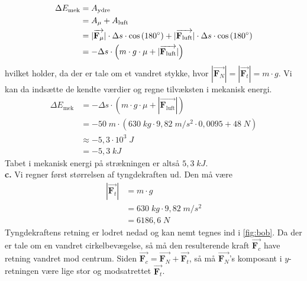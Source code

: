 \documentclass{report}
\begin{document}
\begin{equation*}
\begin{split}
  \Delta E _{\text{mek} }&=A _{\text{ydre} }\\
  &=A _{\mu }+A _{\text{luft} }\\
  &=|\overrightarrow{\textbf{F}_{\mu}}| \cdot \Delta s \cdot \cos\left(180 \degree \right) + |\overrightarrow{\textbf{F}_{\text{luft}}}| \cdot \Delta s \cdot \cos\left(180 \degree \right) \\
  &=-\Delta s \cdot \left(m \cdot g \cdot \mu+|\overrightarrow{\textbf{F}_{\text{luft}}}|\right) 
\end{split}
\end{equation*}
hvilket holder, da der er tale om et vandret stykke, hvor $|\overrightarrow{\textbf{F}_N} |=|\overrightarrow{\textbf{F}_t} |=m \cdot g$.
Vi kan da indsætte de kendte værdier og regne tilvæksten i mekanisk energi.
\begin{equation*}
\begin{split}
  \Delta E _{\text{mek} }&=-\Delta s \cdot \left(m \cdot g \cdot \mu+|\overrightarrow{\textbf{F}_{\text{luft}}}|\right) \\
  &=-50 \;\unit{m} \cdot \left(630 \;\unit{kg} \cdot 9,82 \;\unit{m/s^2} \cdot 0,0095 + 48 \;\unit{N} \right) \\
  &\approx -5,3 \cdot 10^3 \;\unit{J} \\
  &=-5,3 \;\unit{kJ} 
\end{split}
\end{equation*}
Tabet i mekanisk energi på strækningen er altså $5,3 \;\unit{kJ} $.\\[1ex]
\textbf{c.}
Vi regner først størrelsen af tyngdekraften ud.
Den må være
\begin{equation*}
\begin{split}
  |\overrightarrow{\textbf{F}_t}|&= m \cdot g\\
  &=630 \;\unit{kg} \cdot 9,82 \;\unit{m/s^2} \\
  &=6186,6 \;\unit{N} 
\end{split}
\end{equation*}
Tyngdekraftens retning er lodret nedad og kan nemt tegnes ind i \cref{fig:bob}.
Da der er tale om en vandret cirkelbevægelse, så må den resulterende kraft $\overrightarrow{\textbf{F}_c} $ have retning vandret mod centrum. 
Siden $\overrightarrow{\textbf{F}_c} = \overrightarrow{\textbf{F}_N}+\overrightarrow{\textbf{F}_t} $, så må $\overrightarrow{\textbf{F}_N}$'s komposant i $y$-retningen være lige stor og modsatrettet $\overrightarrow{\textbf{F}_t}$. 
\end{document}

